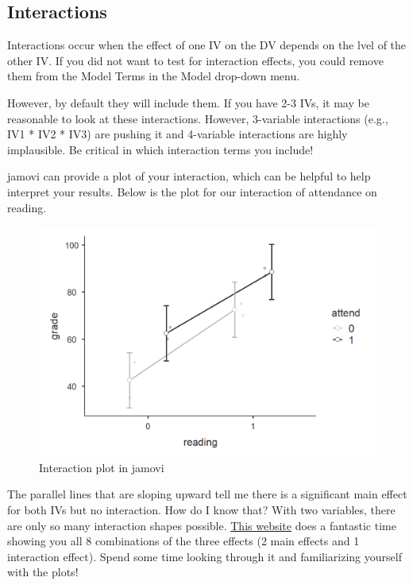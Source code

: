 \documentclass[
]{book}
\begin{document}
\hypertarget{interactions}{%
\subsection{Interactions}\label{interactions}}

Interactions occur when the effect of one IV on the DV depends on the lvel of the other IV. If you did not want to test for interaction effects, you could remove them from the Model Terms in the Model drop-down menu.

However, by default they will include them. If you have 2-3 IVs, it may be reasonable to look at these interactions. However, 3-variable interactions (e.g., IV1 * IV2 * IV3) are pushing it and 4-variable interactions are highly implausible. Be critical in which interaction terms you include!

jamovi can provide a plot of your interaction, which can be helpful to help interpret your results. Below is the plot for our interaction of attendance on reading.

\begin{figure}

{\centering \includegraphics[width=1\linewidth]{images/06-factorial-anova/independent-factorial_plot} 

}

\caption{Interaction plot in jamovi}\label{fig:unnamed-chunk-4}
\end{figure}

The parallel lines that are sloping upward tell me there is a significant main effect for both IVs but no interaction. How do I know that? With two variables, there are only so many interaction shapes possible. \href{https://courses.washington.edu/smartpsy/interactions.htm}{This website} does a fantastic time showing you all 8 combinations of the three effects (2 main effects and 1 interaction effect). Spend some time looking through it and familiarizing yourself with the plots!
\end{document}
